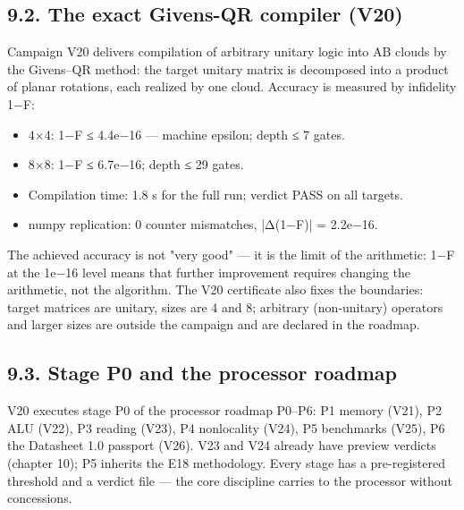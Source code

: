 \documentclass[11pt,a4paper]{article}
\begin{document}
\subsection{9.2. The exact Givens-QR compiler (V20)}

Campaign V20 delivers compilation of arbitrary unitary logic into AB clouds by the Givens–QR method: the target unitary matrix is decomposed into a product of planar rotations, each realized by one cloud. Accuracy is measured by infidelity 1−F:

\begin{itemize}
  \item 4×4: 1−F ≤ 4.4e−16 — machine epsilon; depth ≤ 7 gates.
  \item 8×8: 1−F ≤ 6.7e−16; depth ≤ 29 gates.
  \item Compilation time: 1.8 s for the full run; verdict PASS on all targets.
  \item numpy replication: 0 counter mismatches, |Δ(1−F)| = 2.2e−16.
\end{itemize}

\begin{center}\end{center}

The achieved accuracy is not "very good" — it is the limit of the arithmetic: 1−F at the 1e−16 level means that further improvement requires changing the arithmetic, not the algorithm. The V20 certificate also fixes the boundaries: target matrices are unitary, sizes are 4 and 8; arbitrary (non-unitary) operators and larger sizes are outside the campaign and are declared in the roadmap.

\subsection{9.3. Stage P0 and the processor roadmap}

V20 executes stage P0 of the processor roadmap P0–P6: P1 memory (V21), P2 ALU (V22), P3 reading (V23), P4 nonlocality (V24), P5 benchmarks (V25), P6 the Datasheet 1.0 passport (V26). V23 and V24 already have preview verdicts (chapter 10); P5 inherits the E18 methodology. Every stage has a pre-registered threshold and a verdict file — the core discipline carries to the processor without concessions.
\end{document}
